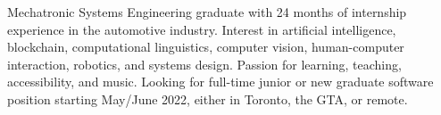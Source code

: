 

\begin{cvparagraph}

    Mechatronic Systems Engineering graduate with 24 months of internship experience in the automotive industry.
    Interest in artificial intelligence, blockchain, computational linguistics, computer vision, human-computer interaction, robotics, and systems design.
    Passion for learning, teaching, accessibility, and music.
    Looking for full-time junior or new graduate software position starting May/June 2022, either in Toronto, the GTA, or remote.
\end{cvparagraph}

